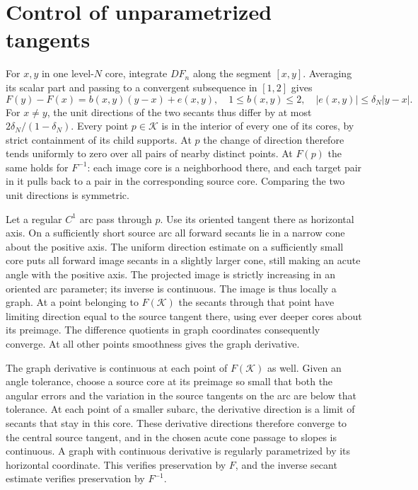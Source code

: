 \documentclass[11pt,a4paper]{amsart}
\newcommand{\Cset}{\mathcal K}
\begin{document}
\section{Control of unparametrized tangents}
For \(x,y\) in one level-\(N\) core, integrate \(DF_n\) along the segment \([x,y]\). Averaging its scalar part and passing to a convergent subsequence in \([1,2]\) gives
\[
 F(y)-F(x)=b(x,y)(y-x)+e(x,y),\quad
 1\le b(x,y)\le2,\quad |e(x,y)|\le\delta_N|y-x|.
\]
For \(x\ne y\), the unit directions of the two secants thus differ by at most \(2\delta_N/(1-\delta_N)\). Every point \(p\in\Cset\) is in the interior of every one of its cores, by strict containment of its child supports. At \(p\) the change of direction therefore tends uniformly to zero over all pairs of nearby distinct points. At \(F(p)\) the same holds for \(F^{-1}\): each image core is a neighborhood there, and each target pair in it pulls back to a pair in the corresponding source core. Comparing the two unit directions is symmetric.

Let a regular \(C^1\) arc pass through \(p\). Use its oriented tangent there as horizontal axis. On a sufficiently short source arc all forward secants lie in a narrow cone about the positive axis. The uniform direction estimate on a sufficiently small core puts all forward image secants in a slightly larger cone, still making an acute angle with the positive axis. The projected image is strictly increasing in an oriented arc parameter; its inverse is continuous. The image is thus locally a graph. At a point belonging to \(F(\Cset)\) the secants through that point have limiting direction equal to the source tangent there, using ever deeper cores about its preimage. The difference quotients in graph coordinates consequently converge. At all other points smoothness gives the graph derivative.

The graph derivative is continuous at each point of \(F(\Cset)\) as well. Given an angle tolerance, choose a source core at its preimage so small that both the angular errors and the variation in the source tangents on the arc are below that tolerance. At each point of a smaller subarc, the derivative direction is a limit of secants that stay in this core. These derivative directions therefore converge to the central source tangent, and in the chosen acute cone passage to slopes is continuous. A graph with continuous derivative is regularly parametrized by its horizontal coordinate. This verifies preservation by \(F\), and the inverse secant estimate verifies preservation by \(F^{-1}\).
\end{document}
